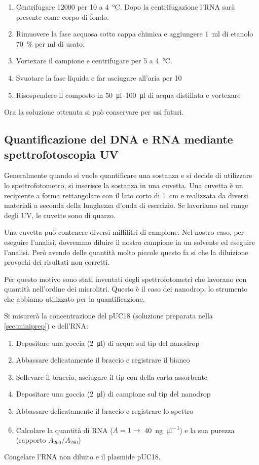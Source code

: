 \begin{enumerate}
	\item Centrifugare \qty{12000}{\giri} per \qty{10}{\min} a \qty{4}{\celsius}. Dopo la centrifugazione l’RNA sarà presente come corpo di fondo.
	\item Rimuovere la fase acquosa sotto cappa chimica e aggiungere \qty{1}{ml} di etanolo \qty{70}{\percent} per \unit{\ml} di \trizol usato.
	\item Vortexare il campione e centrifugare per \qty{5}{\min} a \qty{4}{\celsius}.
	\item Svuotare la fase liquida e far asciugare all’aria per \qty{10}{\min}
	\item Risospendere il composto in \qtyrange{50}{100}{\micro\litre} di acqua distillata e vortexare	
\end{enumerate}
Ora la soluzione ottenuta si può conservare per usi futuri.

\subsection{Quantificazione del DNA e RNA mediante spettrofotoscopia UV}
\begin{Informazione}
	Generalmente quando si vuole quantificare una sostanza e si decide di utilizzare lo spettrofotometro, si inserisce la sostanza in una cuvetta. Una cuvetta è un recipiente a forma rettangolare con il lato corto di \qty{1}{cm} e realizzata da diversi materiali a seconda della lunghezza d'onda di esercizio. Se lavoriamo nel range degli UV, le cuvette sono di quarzo.

	Una cuvetta può contenere diversi millilitri di campione. Nel nostro caso, per eseguire l'analisi, dovremmo diluire il nostro campione in un solvente ed eseguire l'analisi. Però avendo delle quantità molto piccole questo fa si che la diluizione provochi dei risultati non corretti. 

	Per questo motivo sono stati inventati degli spettrofotometri che lavorano con quantità nell'ordine dei microlitri. Questo è il caso dei nanodrop, lo strumento che abbiamo utilizzato per la quantificazione.
\end{Informazione}

\noindent Si misurerà la concentrazione del pUC18 (soluzione preparata nella \autoref{sec:miniprep}) e dell'RNA:
\begin{enumerate}
	\item Depositare una goccia (\qty{2}{\micro\litre}) di acqua sul tip del nanodrop
	\item Abbassare delicatamente il braccio e registrare il bianco
	\item Sollevare il braccio, asciugare il tip con della carta assorbente
	\item Depositare una goccia (\qty{2}{\micro\litre}) di campione sul tip del nanodrop
	\item Abbassare delicatamente il braccio e registrare lo spettro
	\item Calcolare la quantità di RNA (\(A=1\to\) \qty{40}{\ng\per\micro\litre}) e la sua purezza (rapporto \(A_{260}/A_{280}\))
\end{enumerate}
Congelare l'RNA non diluito e il plasmide pUC18.

